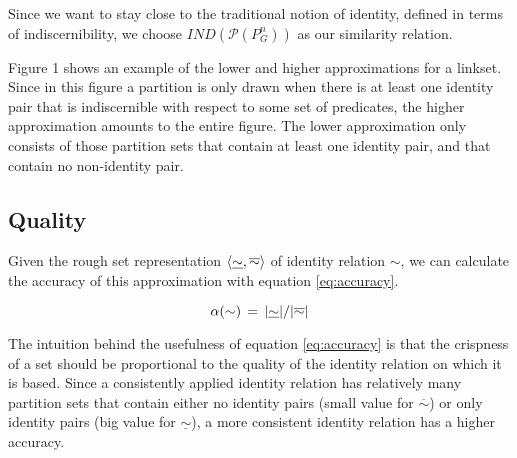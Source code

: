 \begin{comment}
\small
\begin{definition}[Higher \& lower approximation]
\label{def:higher_lower_approximation}
\begin{align}
  y \in [x]_H
\,\iff\,\\
  \exists u (
      \cardinality{[u]_{\sim}}>1
    \,\land\,
      \mathbb{P}([u]_{\sim})=\mathbb{P}(\set{x,y})
  )\nonumber
\\
  y \in [x]_L
\,\iff\,
  \forall S \subseteq D (\\
      (\cardinality{S}>1 \,\land\, \mathbb{P}(S) = \mathbb{P}(\set{x,y}))
    \,\rightarrow\,
      \exists s \in D (S=[s]_{\sim})
  )\nonumber
\end{align}
\end{definition}
\normalsize
\end{comment}

\noindent Since we want to stay close to the traditional notion of identity,
  defined in terms of indiscernibility,
  we choose $\mathit{IND}(\mathcal{P}(P_G^n))$ as our similarity relation.

Figure 1 shows an example of the lower and higher
  approximations for a linkset.
Since in this figure a partition is only drawn when there is at least one
  identity pair that is indiscernible with respect to some set of
  predicates, the higher approximation amounts to the entire figure.
The lower approximation only consists of those partition sets that contain
  at least one identity pair, and that contain no non-identity pair.

\subsection{Quality}
\label{sec:quality}

Given the rough set representation $\langle\underline{\sim},\overline{\sim}\rangle$
  of identity relation $\sim$, we can calculate the accuracy of this
  approximation with equation \ref{eq:accuracy}.

\small
\begin{equation}
\label{eq:accuracy}
  \alpha(\sim)
\,=\,
  \lvert\underline{\sim}\rvert / {\lvert\overline{\sim}\rvert}
\end{equation}
\normalsize

The intuition behind the usefulness of equation \ref{eq:accuracy}
  is that the crispness of a set should be proportional to the quality
  of the identity relation on which it is based.
Since a consistently applied identity relation has relatively many
  partition sets that contain either
  no identity pairs (small value for $\overline{\sim}$) or
  only identity pairs (big value for $\underline{\sim}$),
  a more consistent identity relation has a higher accuracy.

